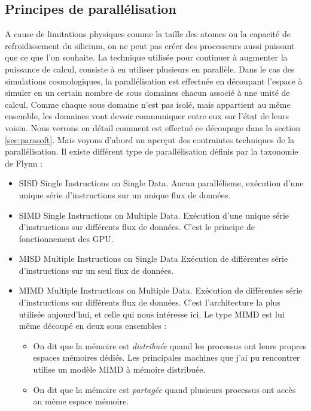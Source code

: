\subsection{Principes de parallélisation}

A cause de limitations physiques comme la taille des atomes ou la capacité de refroidissement du silicium, on ne peut pas créer des processeurs aussi puissant que ce que l'on souhaite.
La technique utilisée pour continuer à augmenter la puissance de calcul, consiste à en utiliser plusieurs en parallèle.
Dans le cas des simulations cosmologiques, la parallélisation est effectuée en découpant l'espace à simuler en un certain nombre de sous domaines chacun associé à une unité de calcul.
Comme chaque sous domaine n'est pas isolé, mais appartient au même ensemble, les domaines vont devoir communiquer entre eux sur l'état de leurs voisin.
Nous verrons en détail comment est effectué ce découpage dans la section \ref{sec:parasoft}.
Mais voyons d'abord un aperçut des contraintes techniques de la parallélisation.
Il existe différent type de parallélisation définis par la taxonomie de Flynn \citep{Flynn:1972:COE:1952456.1952459}: 

\begin{itemize}
\item SISD Single Instructions on Single Data.
Aucun parallélisme, exécution d'une unique série d'instructions sur un unique flux de données.

\item SIMD Single Instructions on Multiple Data.
Exécution d'une unique série d'instructions sur différents flux de données.
C'est le principe de fonctionnement des GPU.

\item MISD Multiple Instructions on Single Data 
Exécution de différentes série d'instructions sur un seul flux de données.

\item MIMD Multiple Instructions on Multiple Data.
Exécution de différentes série d'instructions sur différents flux de données.
C'est l’architecture la plus utilisée aujourd'hui, et celle qui nous intéresse ici.
Le type MIMD est lui même découpé en deux sous ensembles : 

\begin{itemize}
\item On dit que la mémoire est \textit{distribuée} quand les processus ont leurs propres espaces mémoires dédiés.
Les principales machines que j'ai pu rencontrer utilise un modèle MIMD à mémoire distribuée.

\item On dit que la mémoire est \textit{partagée} quand plusieurs processus ont accès au mème espace mémoire.
\end{itemize}
\end{itemize}

